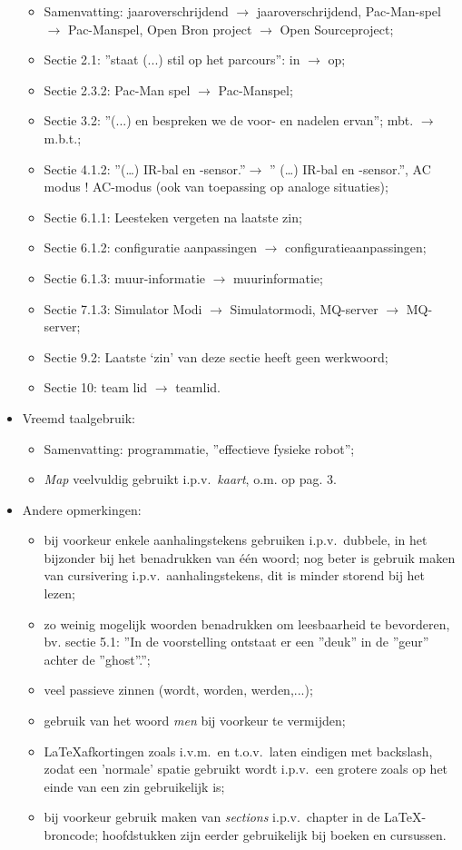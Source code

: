 \documentclass[12pt,a4paper]{report}
\begin{document}
\begin{itemize}
\begin{itemize}
	\item Samenvatting: jaaroverschrijdend $\rightarrow$ jaaroverschrijdend, Pac-Man-spel$\rightarrow$ Pac-Manspel, Open Bron project $\rightarrow$ Open Sourceproject;
	\item Sectie 2.1: ''staat (...) stil op het parcours'': in $\rightarrow$ op;
	\item Sectie 2.3.2: Pac-Man spel $\rightarrow$ Pac-Manspel;
	\item Sectie 3.2: ''(...) en bespreken we de voor- en nadelen ervan''; mbt. $\rightarrow$ m.b.t.;
	\item Sectie 4.1.2: ''(\ldots) IR-bal en -sensor.''$\rightarrow$  '' (\ldots) IR-bal en -sensor.'', AC modus ! AC-modus (ook van
toepassing op analoge situaties);
	\item Sectie 6.1.1: Leesteken vergeten na laatste zin;
	\item Sectie 6.1.2: configuratie aanpassingen $\rightarrow$ configuratieaanpassingen;
	\item Sectie 6.1.3: muur-informatie $\rightarrow$ muurinformatie;
	\item Sectie 7.1.3: Simulator Modi $\rightarrow$ Simulatormodi, MQ-server $\rightarrow$ MQ-server;
	\item Sectie 9.2: Laatste `zin' van deze sectie heeft geen werkwoord;
	\item Sectie 10: team lid $\rightarrow$ teamlid.
\end{itemize}
	\item Vreemd taalgebruik:
  \begin{itemize}
	\item Samenvatting: programmatie, ''effectieve fysieke robot'';
	\item \textit{Map} veelvuldig gebruikt i.p.v.\ \textit{kaart}, o.m. op pag. 3.
\end{itemize}
	\item Andere opmerkingen:
\begin{itemize}
	\item bij voorkeur enkele aanhalingstekens gebruiken i.p.v.\ dubbele, in het bijzonder bij het benadrukken van \'e\'en
woord; nog beter is gebruik maken van cursivering i.p.v.\ aanhalingstekens, dit is minder storend bij het
lezen;
	\item zo weinig mogelijk woorden benadrukken om leesbaarheid te bevorderen, bv. sectie 5.1: ''In de voorstelling ontstaat er een ''deuk'' in de ''geur'' achter de ''ghost''.'';
	\item veel passieve zinnen (wordt, worden, werden,...);
	\item gebruik van het woord \textit{men} bij voorkeur te vermijden;
	\item \LaTeX afkortingen zoals i.v.m.\ en t.o.v.\ laten eindigen met backslash, zodat een 'normale' spatie gebruikt
wordt i.p.v.\ een grotere zoals op het einde van een zin gebruikelijk is;
	\item bij voorkeur gebruik maken van \textit{sections} i.p.v.\ chapter in de \LaTeX-broncode; hoofdstukken zijn eerder gebruikelijk bij boeken en cursussen.
\end{itemize}
\end{itemize}
\end{document}
